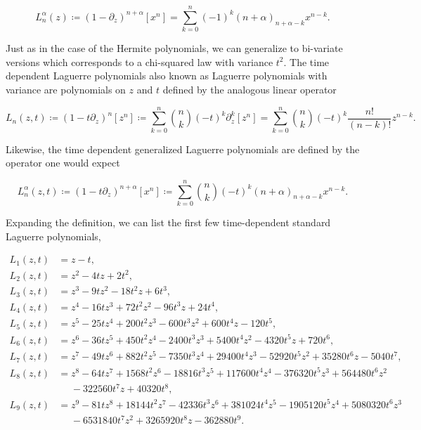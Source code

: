     \begin{equation*}
        L_n^{\alpha}(z) \coloneqq \left( 1 - \partial_z \right)^{n+\alpha}[x^n] = \sum_{k=0}^n (-1)^k (n+\alpha)_{n+\alpha-k} x^{n-k}.
    \end{equation*}

    Just as in the case of the Hermite polynomials, we can generalize to bi-variate versions which corresponds to a chi-squared law with variance $t^2$. The time dependent Laguerre polynomials also known as Laguerre polynomials with variance are polynomials on $z$ and $t$ defined by the analogous linear operator

    \begin{equation} \label{eq:laguerre_with_variance}
        L_n(z,t) \coloneqq (1 - t\partial_z)^n [z^n] \coloneqq \sum_{k=0}^n \binom{n}{k} (-t)^k\partial_z^k[z^n] = \sum_{k=0}^n \binom{n}{k} (-t)^k \frac{n!}{(n-k)!} z^{n-k}.
    \end{equation}

    Likewise, the time dependent generalized Laguerre polynomials are defined by the operator one would expect

    \begin{equation*}
        L_n^{\alpha}(z,t) \coloneqq \left( 1 - t\partial_z \right)^{n+\alpha}[x^n] \coloneqq \sum_{k=0}^n \binom nk (-t)^k (n+\alpha)_{n+\alpha-k}x^{n-k}.
    \end{equation*}

    Expanding the definition, we can list the first few time-dependent standard Laguerre polynomials,

    \begin{align*}
        L_1(z,t) &= z - t, \\
        L_2(z,t) &= z^2 - 4tz + 2t^2,\\
        L_3(z,t) &= z^3 - 9tz^2 - 18t^2z + 6t^3, \\
        L_4(z,t) &= z^4 - 16tz^3 + 72t^2z^2 - 96t^3z + 24t^4,\\
        L_5(z,t) &= z^5 - 25tz^4 + 200t^2z^3 - 600t^3z^2 + 600t^4z - 120t^5,\\
        L_6(z,t) &= z^6 - 36tz^5 + 450t^2z^4 - 2400t^3z^3 + 5400t^4z^2 - 4320t^5z + 720t^6, \\
        L_7(z,t) &= z^7 - 49tz^6 + 882t^2z^5 -7350t^3z^4 + 29400t^4z^3 - 52920t^5z^2 + 35280t^6z - 5040t^7,\\
        L_8(z,t) &= z^8 - 64tz^7 + 1568t^2z^6 - 18816t^3z^5 + 117600t^4z^4 - 376320t^5z^3 + 564480t^6z^2\\ &\phantom{=}- 322560t^7z + 40320t^8,\\
        L_9(z,t) &= z^{9}-81tz^{8}+18144t^2z^{7}-42336t^3z^{6}+381024t^4z^{5}-1905120t^5z^{4}+5080320t^6z^{3}\\ 
        &\phantom{=}-6531840t^7z^{2} +3265920t^8z-362880t^9.
    \end{align*}


